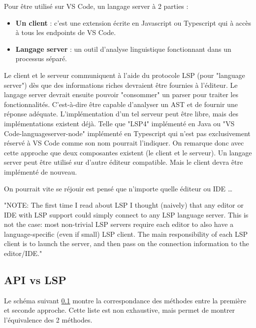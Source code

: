 \documentclass[
    iict, %
    il, %
]{heig-tb}
\begin{document}
Pour être utilisé sur VS Code, un langage server à 2 parties :
\begin{itemize}
    \item \textbf{Un client} : c'est une extension écrite en Javascript ou Typescript qui à accès à tous les endpoints de VS Code.
    \item \textbf{Langage server} : un outil d'analyse linguistique fonctionnant dans un processus séparé.
\end{itemize}

\vspace{\parskip}

Le client et le serveur communiquent à l'aide du protocole LSP (pour "language server") dès que des informations riches devraient être fournies à l'éditeur.
Le langage server devrait ensuite pouvoir "consommer" un parser pour traiter les fonctionnalités. C'est-à-dire être capable d'analyser un AST et de fournir une réponse adéquate.
L'implémentation d'un tel serveur peut être libre, mais des implémentations existent déjà. Telle que "LSP4" implémenté en Java ou  "VS Code-languageserver-node" implémenté en Typescript qui n'est pas exclusivement réservé à VS Code comme son nom pourrait l'indiquer.
On remarque donc avec cette approche que deux composantes existent (le client et le serveur).
Un langage server peut être utilisé sur d'autre éditeur compatible. Mais le client devra être implémenté de nouveau.

On pourrait vite se réjouir est pensé que n'importe quelle éditeur ou IDE \dots

"NOTE: The first time I read about LSP I thought (naively) that any editor or IDE with LSP support could simply connect to any LSP language server. 
This is not the case: most non-trivial LSP servers require each editor to also have a language-specific (even if small) LSP client. 
The main responsibility of each LSP client is to launch the server, and then pass on the connection information to the editor/IDE."



\subsection{API vs LSP}\label{api vs lsp}

Le schéma suivant \ref{api vs lsp} montre la correspondance des méthodes entre la première et seconde approche.
Cette liste est non exhaustive, mais permet de montrer l'équivalence des 2 méthodes.
\end{document}

